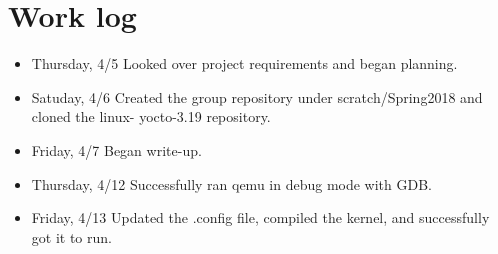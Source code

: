 \documentclass[journal,10pt,onecolumn,letterpaper,draftclsnofoot]{IEEEtran}
\begin{document}
\section{Work log}

\begin{itemize}
\item Thursday, 4/5 Looked over project requirements and began planning.
\item Satuday, 4/6  Created the group repository under scratch/Spring2018 and cloned the linux- yocto-3.19 repository.
\item Friday, 4/7 Began write-up.
\item Thursday, 4/12 Successfully ran qemu in debug mode with GDB.
\item Friday, 4/13 Updated the .config file, compiled the kernel, and successfully got it to run.
\end{itemize}
\end{document}
